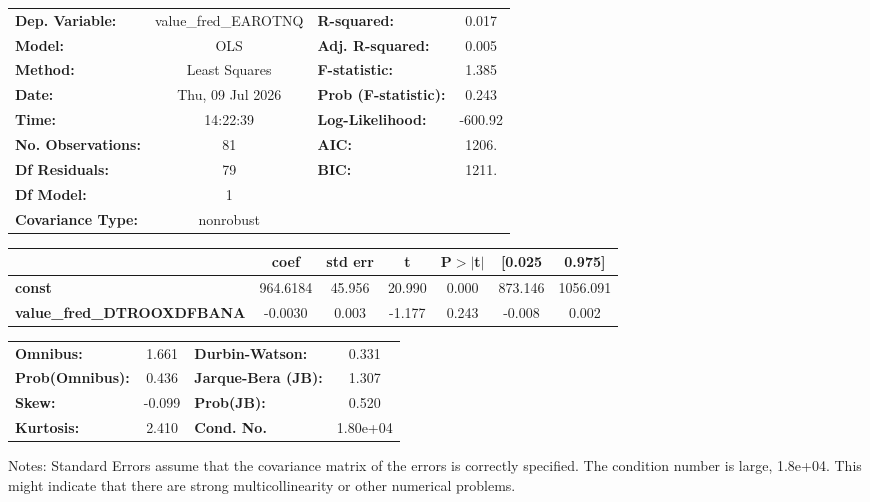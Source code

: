 \begin{center}
\begin{tabular}{lclc}
\toprule
\textbf{Dep. Variable:}            & value\_fred\_EAROTNQ & \textbf{  R-squared:         } &     0.017   \\
\textbf{Model:}                    &         OLS          & \textbf{  Adj. R-squared:    } &     0.005   \\
\textbf{Method:}                   &    Least Squares     & \textbf{  F-statistic:       } &     1.385   \\
\textbf{Date:}                     &   Thu, 09 Jul 2026   & \textbf{  Prob (F-statistic):} &    0.243    \\
\textbf{Time:}                     &       14:22:39       & \textbf{  Log-Likelihood:    } &   -600.92   \\
\textbf{No. Observations:}         &            81        & \textbf{  AIC:               } &     1206.   \\
\textbf{Df Residuals:}             &            79        & \textbf{  BIC:               } &     1211.   \\
\textbf{Df Model:}                 &             1        & \textbf{                     } &             \\
\textbf{Covariance Type:}          &      nonrobust       & \textbf{                     } &             \\
\bottomrule
\end{tabular}
\begin{tabular}{lcccccc}
                                   & \textbf{coef} & \textbf{std err} & \textbf{t} & \textbf{P$> |$t$|$} & \textbf{[0.025} & \textbf{0.975]}  \\
\midrule
\textbf{const}                     &     964.6184  &       45.956     &    20.990  &         0.000        &      873.146    &     1056.091     \\
\textbf{value\_fred\_DTROOXDFBANA} &      -0.0030  &        0.003     &    -1.177  &         0.243        &       -0.008    &        0.002     \\
\bottomrule
\end{tabular}
\begin{tabular}{lclc}
\textbf{Omnibus:}       &  1.661 & \textbf{  Durbin-Watson:     } &    0.331  \\
\textbf{Prob(Omnibus):} &  0.436 & \textbf{  Jarque-Bera (JB):  } &    1.307  \\
\textbf{Skew:}          & -0.099 & \textbf{  Prob(JB):          } &    0.520  \\
\textbf{Kurtosis:}      &  2.410 & \textbf{  Cond. No.          } & 1.80e+04  \\
\bottomrule
\end{tabular}
\end{center}

Notes: \newline
 [1] Standard Errors assume that the covariance matrix of the errors is correctly specified. \newline
 [2] The condition number is large, 1.8e+04. This might indicate that there are \newline
 strong multicollinearity or other numerical problems.